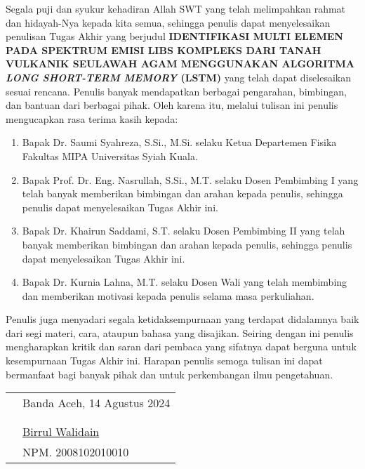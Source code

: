 \preface %


Segala puji dan syukur kehadiran Allah SWT yang telah melimpahkan rahmat dan hidayah-Nya kepada kita semua, sehingga penulis dapat menyelesaikan penulisan Tugas Akhir yang berjudul \textbf{\MakeUppercase{Identifikasi Multi Elemen pada Spektrum Emisi LIBS Kompleks Dari Tanah Vulkanik Seulawah Agam Menggunakan Algoritma \textit{Long Short-Term Memory} (LSTM)}} yang telah dapat diselesaikan sesuai rencana. Penulis banyak mendapatkan berbagai pengarahan, bimbingan, dan bantuan dari berbagai pihak. Oleh karena itu, melalui tulisan ini penulis mengucapkan rasa terima kasih kepada:

\begin{enumerate} 

	\item {Bapak Dr. Saumi Syahreza, S.Si., M.Si. selaku Ketua Departemen Fisika Fakultas MIPA Universitas Syiah Kuala.}

	\item{Bapak Prof. Dr. Eng. Nasrullah, S.Si., M.T.
 selaku Dosen Pembimbing I yang telah banyak memberikan bimbingan dan arahan kepada penulis, sehingga penulis dapat menyelesaikan Tugas Akhir ini.}
	\item{Bapak Dr. Khairun Saddami, S.T.
 selaku Dosen Pembimbing II yang telah banyak memberikan bimbingan dan arahan kepada penulis, sehingga penulis dapat menyelesaikan Tugas Akhir ini.}

	\item{Bapak Dr. Kurnia Lahna, M.T. selaku Dosen Wali yang telah membimbing
dan memberikan motivasi kepada penulis selama masa perkuliahan.}
\end{enumerate}


Penulis juga menyadari segala ketidaksempurnaan yang terdapat didalamnya baik dari segi materi, cara, ataupun bahasa yang disajikan. Seiring dengan ini penulis mengharapkan kritik dan saran dari pembaca yang sifatnya dapat berguna untuk kesempurnaan Tugas Akhir ini. Harapan penulis semoga tulisan ini dapat bermanfaat bagi banyak pihak dan untuk perkembangan ilmu pengetahuan.

\vspace{1cm}


\begin{tabular}{p{7.5cm}l}
	&Banda Aceh, 14 Agustus 2024\\
	&\\
	&\\
	&\multirow{1.5}{7.5cm}{\underline{Birrul Walidain}} \\ 
	&NPM. 2008102010010 \\
\end{tabular}
